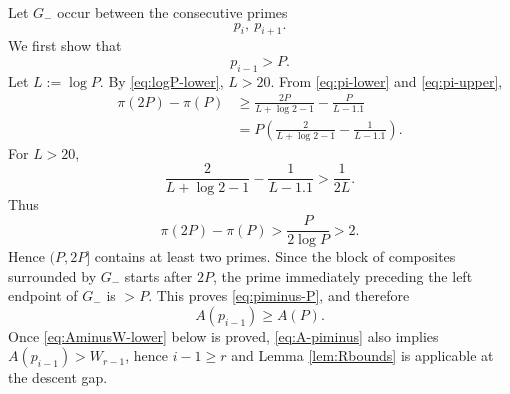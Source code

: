 \documentclass[11pt]{article}
\numberwithin{equation}{section}
\theoremstyle{plain}
\theoremstyle{definition}
\theoremstyle{remark}
\begin{document}
Let \(G_-\) occur between the consecutive primes
\[
        p_i,\ p_{i+1}.
\]
We first show that
\begin{equation}\label{eq:piminus-P}
p_{i-1}>P.
\end{equation}
Let \(L:=\log P\).  By \eqref{eq:logP-lower}, \(L>20\).  From \eqref{eq:pi-lower} and \eqref{eq:pi-upper},
\[
\begin{aligned}
        \pi(2P)-\pi(P)
        &\ge
        \frac{2P}{L+\log2-1}
        -
        \frac{P}{L-1.1}\\
        &=
        P\left(
        \frac2{L+\log2-1}
        -
        \frac1{L-1.1}
        \right).
\end{aligned}
\]
For \(L>20\),
\[
        \frac2{L+\log2-1}
        -
        \frac1{L-1.1}
        >
        \frac1{2L}.
\]
Thus
\[
        \pi(2P)-\pi(P)>\frac{P}{2\log P}>2.
\]
Hence \((P,2P]\) contains at least two primes.  Since the block of composites surrounded by \(G_-\) starts after \(2P\), the prime immediately preceding the left endpoint of \(G_-\) is \(>P\).  This proves \eqref{eq:piminus-P}, and therefore
\begin{equation}\label{eq:A-piminus}
A(p_{i-1})\ge A(P).
\end{equation}
Once \eqref{eq:AminusW-lower} below is proved, \eqref{eq:A-piminus} also implies \(A(p_{i-1})>W_{r-1}\), hence \(i-1\ge r\) and Lemma \ref{lem:Rbounds} is applicable at the descent gap.
\end{document}
